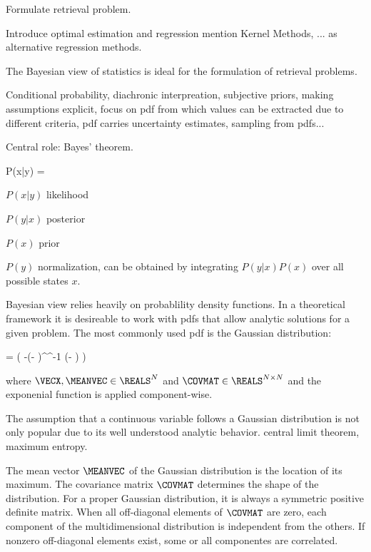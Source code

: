Formulate retrieval problem.

Introduce optimal estimation and regression mention Kernel Methods, ... as
alternative regression methods.

\startsection[title=Bayesian Statistics]

    The Bayesian view of statistics is ideal for the formulation of retrieval
    problems. 

    Conditional probability, diachronic interpreation, subjective priors,
    making assumptions explicit, focus on pdf from which values can be
    extracted due to different criteria, pdf carries uncertainty estimates,
    sampling from pdfs...

    Central role: Bayes' theorem.
    
    \startformula
        P(x|y) = 
    \stopformula

    $P(x|y)$ likelihood

    $P(y|x)$ posterior

    $P(x)$ prior

    $P(y)$ normalization, can be obtained by integrating $P(y|x)P(x)$
    over all possible states $x$.

\stopsection

\startsection[title=The Multivariate Gaussian Distribution]

    Bayesian view relies heavily on probablility density functions. In a
    theoretical framework it is desireable to work with pdfs that allow
    analytic solutions for a given problem. The most commonly used pdf is the
    Gaussian distribution:

    \startformula
        \GAUSS{\VECX}{\MEANVEC}{\COVMAT}
        = 
          \exp \left( -(\VECX - \MEANVEC)^\top \COVMAT^{-1} (\VECX - \MEANVEC) \right)
    \stopformula

    where $\VECX, \MEANVEC \in \REALS^N$ and $\COVMAT \in \REALS^{N
    \times N}$ and the exponenial function is applied component-wise.

    The assumption that a continuous variable follows a Gaussian distribution
    is not only popular due to its well understood analytic behavior. central
    limit theorem, maximum entropy.

    The mean vector $\MEANVEC$ of the Gaussian distribution is the
    location of its maximum. The covariance matrix $\COVMAT$ determines
    the shape of the distribution. For a proper Gaussian distribution, it is
    always a symmetric positive definite matrix. When all off-diagonal elements
    of $\COVMAT$ are zero, each component of the multidimensional
    distribution is independent from the others. If nonzero off-diagonal
    elements exist, some or all componentes are correlated.

